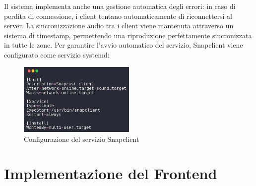 Il sistema implementa anche una gestione automatica degli errori: in caso di perdita di connessione, i client tentano automaticamente di riconnettersi al server. La sincronizzazione audio tra i client viene mantenuta attraverso un sistema di timestamp, permettendo una riproduzione perfettamente sincronizzata in tutte le zone.
Per garantire l'avvio automatico del servizio, Snapclient viene configurato come servizio systemd:

\begin{figure}[H]
    \centering
    \includegraphics[width=0.5\textwidth]{Chapters/Figures/snap_service_audio.png}
    \caption{\small Configurazione del servizio Snapclient} 
    \label{fig:snap_service_audio}
\end{figure}

\newpage
\section{Implementazione del Frontend}
\noindent
